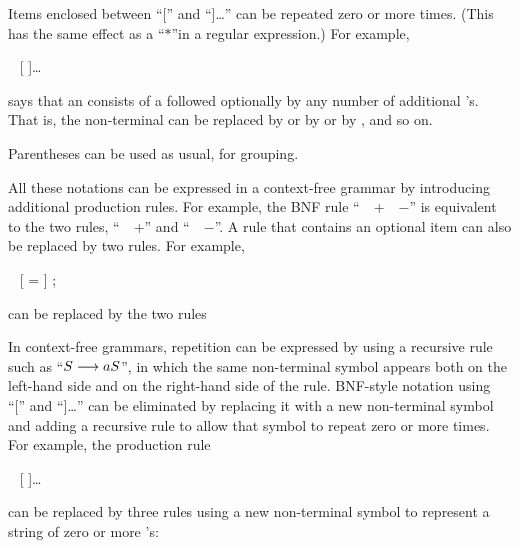 \smallskip
\IItem{$\bullet\,\,$}Items enclosed between ``['' and ``]\dots''
can be repeated zero or more times.  (This has the same effect
as a ``$*$''in a regular expression.)  For example,

\centerline{ \BNFPRODUCES\  [  ]\dots}
\smallskip

\IItem{}says that an  consists of a  followed
optionally by any number of additional 's.  That is,
the non-terminal  can be replaced by  or
by  or by , and
so on.

\smallskip
\IItem{$\bullet\,\,$}Parentheses can be used as usual, for grouping. 
\smallskip

All these notations can be expressed in a context-free grammar
by introducing additional production rules.  For example, the
BNF rule ``~\BNFPRODUCES\ +~\BNFALT~$-$'' is equivalent
to the two rules, ``~\BNFPRODUCES~+''
and ``~\BNFPRODUCES~$-$''.  A rule that contains an
optional item can also be replaced by two rules.  For example,

\smallskip
\centerline{ \BNFPRODUCES\  
                 [ =  ] ;}

\smallskip
\noindent can be replaced by the two rules

\smallskip
\centerline{\vbox{}}
                  
\smallskip
\noindent In context-free grammars, repetition can be expressed by
using a recursive rule such as ``$S\longrightarrow aS$'', in which the
same non-terminal symbol appears both on the left-hand side and on the right-hand
side of the rule.  BNF-style notation using ``['' and ``]\dots'' can
be eliminated by replacing it with a new non-terminal symbol and adding
a recursive rule to allow that symbol to repeat zero or more times.
For example, the production rule

\smallskip
\centerline{ \BNFPRODUCES\  [  ]\dots}

\smallskip
\noindent can be replaced by three rules using a new non-terminal symbol
 to represent a string of zero or more 's:

\smallskip
\centerline{\vbox{}}

